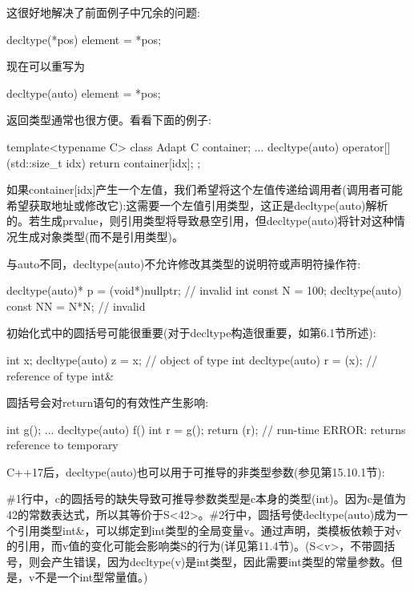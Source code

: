 这很好地解决了前面例子中冗余的问题:

\begin{cpp}
decltype(*pos) element = *pos;
\end{cpp}

现在可以重写为

\begin{cpp}
decltype(auto) element = *pos;
\end{cpp}

返回类型通常也很方便。看看下面的例子:

\begin{cpp}
template<typename C> class Adapt
{
	C container;
	...
	decltype(auto) operator[] (std::size_t idx) {
		return container[idx];
	}
};
\end{cpp}

如果container[idx]产生一个左值，我们希望将这个左值传递给调用者(调用者可能希望获取地址或修改它):这需要一个左值引用类型，这正是decltype(auto)解析的。若生成prvalue，则引用类型将导致悬空引用，但decltype(auto)将针对这种情况生成对象类型(而不是引用类型)。

与auto不同，decltype(auto)不允许修改其类型的说明符或声明符操作符:

\begin{cpp}
decltype(auto)* p = (void*)nullptr; // invalid
int const N = 100;
decltype(auto) const NN = N*N; // invalid
\end{cpp}

初始化式中的圆括号可能很重要(对于decltype构造很重要，如第6.1节所述):

\begin{cpp}
int x;
decltype(auto) z = x; // object of type int
decltype(auto) r = (x); // reference of type int&
\end{cpp}

圆括号会对return语句的有效性产生影响:

\begin{cpp}
int g();
...
decltype(auto) f() {
	int r = g();
	return (r); // run-time ERROR: returns reference to temporary
}
\end{cpp}

C++17后，decltype(auto)也可以用于可推导的非类型参数(参见第15.10.1节):


\#1行中，c的圆括号的缺失导致可推导参数类型是c本身的类型(int)。因为c是值为42的常数表达式，所以其等价于S<42>。\#2行中，圆括号使decltype(auto)成为一个引用类型int\&，可以绑定到int类型的全局变量v。通过声明，类模板依赖于对v的引用，而v值的变化可能会影响类S的行为(详见第11.4节)。(S<v>，不带圆括号，则会产生错误，因为decltype(v)是int类型，因此需要int类型的常量参数。但是，v不是一个int型常量值。)

